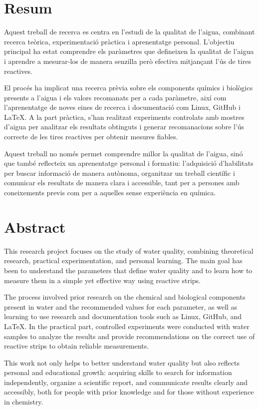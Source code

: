 \chapter*{Resum}
Aquest treball de recerca es centra en l'estudi de la qualitat de l'aigua, combinant recerca teòrica, experimentació pràctica i aprenentatge personal. L'objectiu principal ha estat comprendre els paràmetres que defineixen la qualitat de l'aigua i aprendre a mesurar-los de manera senzilla però efectiva mitjançant l'ús de tires reactives.

El procés ha implicat una recerca prèvia sobre els components químics i biològics presents a l'aigua i els valors recomanats per a cada paràmetre, així com l'aprenentatge de noves eines de recerca i documentació com Linux, GitHub i LaTeX. A la part pràctica, s'han realitzat experiments controlats amb mostres d'aigua per analitzar els resultats obtinguts i generar recomanacions sobre l'ús correcte de les tires reactives per obtenir mesures fiables.

Aquest treball no només permet comprendre millor la qualitat de l'aigua, sinó que també reflecteix un aprenentatge personal i formatiu: l'adquisició d'habilitats per buscar informació de manera autònoma, organitzar un treball científic i comunicar els resultats de manera clara i accessible, tant per a persones amb coneixements previs com per a aquelles sense experiència en química.

\chapter*{Abstract}
This research project focuses on the study of water quality, combining theoretical research, practical experimentation, and personal learning. The main goal has been to understand the parameters that define water quality and to learn how to measure them in a simple yet effective way using reactive strips.

The process involved prior research on the chemical and biological components present in water and the recommended values for each parameter, as well as learning to use research and documentation tools such as Linux, GitHub, and LaTeX. In the practical part, controlled experiments were conducted with water samples to analyze the results and provide recommendations on the correct use of reactive strips to obtain reliable measurements.

This work not only helps to better understand water quality but also reflects personal and educational growth: acquiring skills to search for information independently, organize a scientific report, and communicate results clearly and accessibly, both for people with prior knowledge and for those without experience in chemistry.
